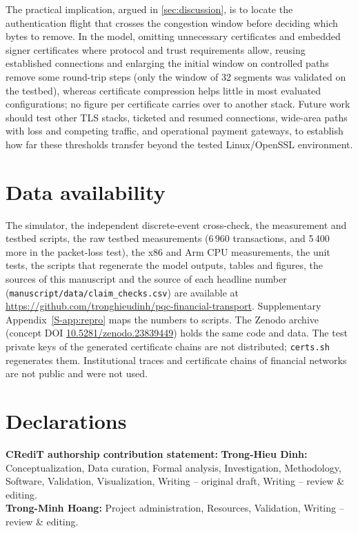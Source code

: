 \documentclass[preprint,12pt]{elsarticle}
\begin{document}
The practical implication, argued in \cref{sec:discussion}, is to locate the authentication flight that crosses the congestion window before deciding which bytes to remove. In the model, omitting unnecessary certificates and embedded signer certificates where protocol and trust requirements allow, reusing established connections and enlarging the initial window on controlled paths remove some round-trip steps (only the window of 32 segments was validated on the testbed), whereas certificate compression helps little in most evaluated configurations; no figure per certificate carries over to another stack. Future work should test other TLS stacks, ticketed and resumed connections, wide-area paths with loss and competing traffic, and operational payment gateways, to establish how far these thresholds transfer beyond the tested Linux/OpenSSL environment.

\section*{Data availability}
The simulator, the independent discrete-event cross-check, the measurement and testbed scripts, the raw testbed measurements (6\,960 transactions, and 5\,400 more in the packet-loss test), the x86 and Arm CPU measurements, the unit tests, the scripts that regenerate the model outputs, tables and figures, the sources of this manuscript and the source of each headline number (\texttt{manuscript/data/claim\_checks.csv}) are available at \url{https://github.com/tronghieudinh/pqc-financial-transport}. Supplementary Appendix~\ref{S-app:repro} maps the numbers to scripts. The Zenodo archive \cite{dinh2026artifact} (concept DOI \href{https://doi.org/10.5281/zenodo.23839449}{10.5281/zenodo.23839449}) holds the same code and data. The test private keys of the generated certificate chains are not distributed; \texttt{certs.sh} regenerates them. Institutional traces and certificate chains of financial networks are not public and were not used.


\section*{Declarations}
\textbf{CRediT authorship contribution statement:}
\textbf{Trong-Hieu Dinh:} Conceptualization, Data curation, Formal analysis, Investigation, Methodology, Software, Validation, Visualization, Writing -- original draft, Writing -- review \& editing.\\
\textbf{Trong-Minh Hoang:} Project administration, Resources, Validation, Writing -- review \& editing.
\end{document}
